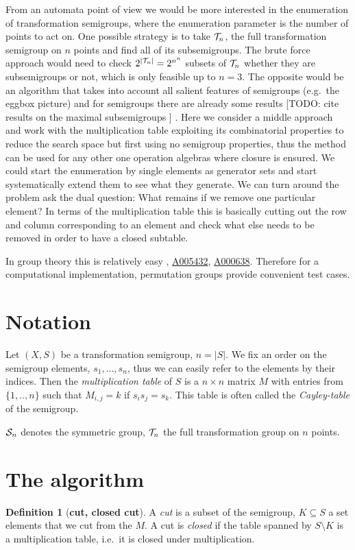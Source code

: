 \documentclass{article}
\theoremstyle{plain}
\theoremstyle{definition}
\newtheorem{definition}[theorem]{Definition}
\newcommand{\cT}{{\cal T}}
\newcommand{\cS}{{\cal S}}
\newcommand{\todo}[1]{ \small \textsf{[TODO:  #1 ]} \normalsize}
\begin{document}
From an automata point of view we would be more interested in the enumeration of transformation semigroups, where the enumeration parameter is the number of points to act on. One possible strategy is to take $\cT_n$, the full transformation semigroup on $n$ points and find all of its subsemigroups. The brute force approach would need to check $2^{|\cT_n|}=2^{n^n}$ subsets of $\cT_n$ whether they are subsemigroups or not, which is only feasible up to $n=3$.
The opposite would be an algorithm that takes into account all salient features of semigroups (e.g.\ the eggbox picture) and for semigroups there are already some results \todo{cite results on the maximal subsemigroups}.  
Here we consider a middle approach and work with the multiplication table exploiting its combinatorial properties to reduce the search space but first using no semigroup properties, thus the method can be used for any other one operation algebras where closure is ensured. We could start the enumeration by single elements as generator sets and start systematically extend them to see what they generate. We can turn around the problem ask the dual question: What remains if we remove one particular element? In terms of the multiplication table this is basically cutting out the row and column corresponding to an element and check what else needs to be removed in order to have a closed subtable.

 In group theory this is relatively easy \cite{Pfeiffer04CountingSubGroups}, \href{https://oeis.org/A005432}{A005432}, \href{https://oeis.org/A000638}{A000638}.  Therefore for a computational implementation, permutation groups provide convenient test cases.



\section{Notation}
Let $(X,S)$ be a transformation semigroup, $n=|S|$. We fix an order on the semigroup elements, $s_1,\ldots, s_n$, thus we can easily refer to the elements by their indices. 
Then the  \emph{multiplication table} of $S$ is a $n\times n$ matrix $M$ with entries from $\{1,..,n\}$ such that $M_{i,j}=k$ if $s_is_j=s_k$. This table is often called the \emph{Cayley-table} of the semigroup.

$\cS_n$ denotes the symmetric group, $\cT_n$ the full transformation group on $n$ points.



\section{The algorithm}
\begin{definition}[\textbf{cut, closed cut}]
A \emph{cut} is a subset of the semigroup, $K\subseteq S$ a set elements that we cut from the $M$.  A cut is \emph{closed} if the table spanned by $S\setminus K$ is a multiplication table, i.e.\ it is closed under multiplication.
\end{definition}
\end{document}
